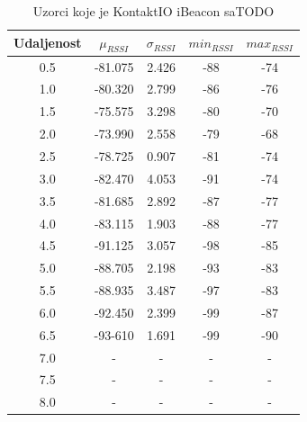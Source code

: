 \begin{table}[H]
	\centering
	\caption{Uzorci koje je KontaktIO iBeacon saTODO}
	\label{tbl:indoorKontaktDefaultTx}
	\begin{tabular}{ccccc}
	\hline
	Udaljenost & $\mu_{RSSI}$ & $\sigma_{RSSI}$ & $min_{RSSI}$ & $max_{RSSI}$ \\
	\hline
	0.5 & -81.075 & 2.426 & -88 & -74 \\
	1.0 & -80.320 & 2.799 & -86 & -76 \\
	1.5 & -75.575 & 3.298 & -80 & -70 \\
	2.0 & -73.990 & 2.558 & -79 & -68 \\
	2.5 & -78.725 & 0.907 & -81 & -74 \\
	3.0 & -82.470 & 4.053 & -91 & -74 \\
	3.5 & -81.685 & 2.892 & -87 & -77 \\
	4.0 & -83.115 & 1.903 & -88 & -77 \\
	4.5 & -91.125 & 3.057 & -98 & -85 \\
	5.0 & -88.705 & 2.198 & -93 & -83 \\
	5.5 & -88.935 & 3.487 & -97 & -83 \\
	6.0 & -92.450 & 2.399 & -99 & -87 \\
	6.5 & -93-610 & 1.691 & -99 & -90 \\
	7.0 & - & - & - & - \\
	7.5 & - & - & - & - \\
	8.0 & - & - & - & - \\
	\hline
	\end{tabular}
\end{table}


